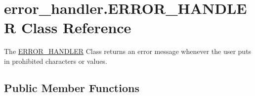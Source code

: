 \hypertarget{classerror__handler_1_1ERROR__HANDLER}{}\section{error\+\_\+handler.\+E\+R\+R\+O\+R\+\_\+\+H\+A\+N\+D\+L\+ER Class Reference}
\label{classerror__handler_1_1ERROR__HANDLER}


The \hyperlink{classerror__handler_1_1ERROR__HANDLER}{E\+R\+R\+O\+R\+\_\+\+H\+A\+N\+D\+L\+ER} Class returns an error message whenever the user puts in prohibited characters or values.  


\subsection*{Public Member Functions}
